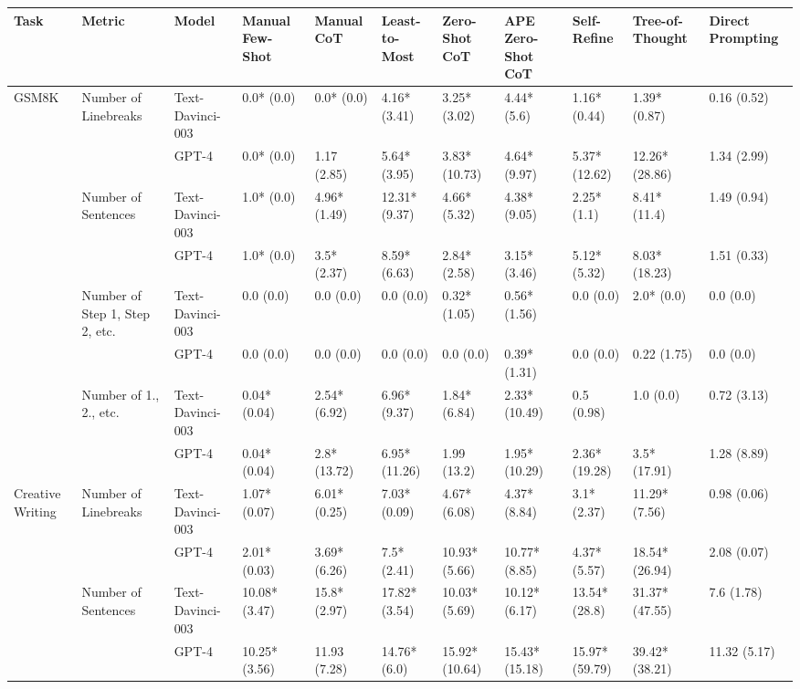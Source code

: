 \begin{tabular}{x{0.75cm}|x{1.5cm}|x{0.75cm}|x{0.75cm}|x{0.75cm}|x{0.75cm}|x{0.75cm}|x{0.75cm}|x{0.75cm}|x{0.75cm}|x{0.75cm}}
\toprule
\hline
Task & Metric & Model & Manual Few-Shot & Manual CoT & Least-to-Most & Zero-Shot CoT & APE Zero-Shot CoT & Self-Refine & Tree-of-Thought & Direct Prompting \\
\hline
\midrule
GSM8K & Number of Linebreaks & Text-Davinci-003 & 0.0* (0.0) & 0.0* (0.0) & 4.16* (3.41) & 3.25* (3.02) & 4.44* (5.6) & 1.16* (0.44) & 1.39* (0.87) & 0.16 (0.52) \\
\hline
 &  & GPT-4 & 0.0* (0.0) & 1.17 (2.85) & 5.64* (3.95) & 3.83* (10.73) & 4.64* (9.97) & 5.37* (12.62) & 12.26* (28.86) & 1.34 (2.99) \\
\hline
 & Number of Sentences & Text-Davinci-003 & 1.0* (0.0) & 4.96* (1.49) & 12.31* (9.37) & 4.66* (5.32) & 4.38* (9.05) & 2.25* (1.1) & 8.41* (11.4) & 1.49 (0.94) \\
\hline
 &  & GPT-4 & 1.0* (0.0) & 3.5* (2.37) & 8.59* (6.63) & 2.84* (2.58) & 3.15* (3.46) & 5.12* (5.32) & 8.03* (18.23) & 1.51 (0.33) \\
\hline
 & Number of Step 1, Step 2, etc. & Text-Davinci-003 & 0.0 (0.0) & 0.0 (0.0) & 0.0 (0.0) & 0.32* (1.05) & 0.56* (1.56) & 0.0 (0.0) & 2.0* (0.0) & 0.0 (0.0) \\
\hline
 &  & GPT-4 & 0.0 (0.0) & 0.0 (0.0) & 0.0 (0.0) & 0.0 (0.0) & 0.39* (1.31) & 0.0 (0.0) & 0.22 (1.75) & 0.0 (0.0) \\
\hline
 & Number of 1., 2., etc. & Text-Davinci-003 & 0.04* (0.04) & 2.54* (6.92) & 6.96* (9.37) & 1.84* (6.84) & 2.33* (10.49) & 0.5 (0.98) & 1.0 (0.0) & 0.72 (3.13) \\
\hline
 &  & GPT-4 & 0.04* (0.04) & 2.8* (13.72) & 6.95* (11.26) & 1.99 (13.2) & 1.95* (10.29) & 2.36* (19.28) & 3.5* (17.91) & 1.28 (8.89) \\
\hline
Creative Writing & Number of Linebreaks & Text-Davinci-003 & 1.07* (0.07) & 6.01* (0.25) & 7.03* (0.09) & 4.67* (6.08) & 4.37* (8.84) & 3.1* (2.37) & 11.29* (7.56) & 0.98 (0.06) \\
\hline
 &  & GPT-4 & 2.01* (0.03) & 3.69* (6.26) & 7.5* (2.41) & 10.93* (5.66) & 10.77* (8.85) & 4.37* (5.57) & 18.54* (26.94) & 2.08 (0.07) \\
\hline
 & Number of Sentences & Text-Davinci-003 & 10.08* (3.47) & 15.8* (2.97) & 17.82* (3.54) & 10.03* (5.69) & 10.12* (6.17) & 13.54* (28.8) & 31.37* (47.55) & 7.6 (1.78) \\
\hline
 &  & GPT-4 & 10.25* (3.56) & 11.93 (7.28) & 14.76* (6.0) & 15.92* (10.64) & 15.43* (15.18) & 15.97* (59.79) & 39.42* (38.21) & 11.32 (5.17) \\

\end{tabular}
